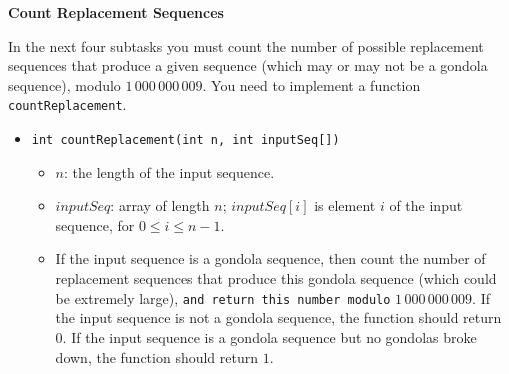 \textbf{Count Replacement Sequences}

In the next four subtasks you must count the number of possible replacement sequences that produce a given sequence (which may or may not be a gondola sequence), modulo $1\,000\,000\,009$. You need to implement a function \texttt{countReplacement}.

\begin{itemize}
\item \texttt{int countReplacement(int n, int inputSeq[])}
\begin{itemize}
\item $n$: the length of the input sequence.
\item $inputSeq$: array of length $n$; $inputSeq[i]$ is element $i$ of the input sequence, for $0 \le i \le n - 1$.
\item If the input sequence is a gondola sequence, then count the number of replacement
sequences that produce this gondola sequence (which could be extremely large), \texttt{and return this number modulo} $1\,000\,000\,009$. If the input sequence is not a gondola sequence, the function should return $0$. If the input sequence is a gondola sequence but no gondolas broke down, the function should return $1$.
\end{itemize}
\end{itemize}
